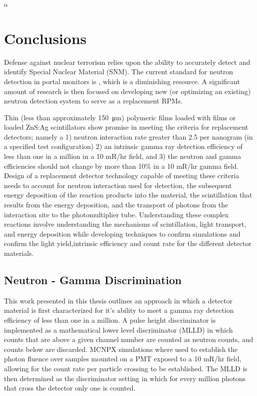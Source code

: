 o\chapter{Conclusions}
\label{chap:Conclusions}
Defense against nuclear terrorism relies upon the ability to accurately detect and identify Special Nuclear Material (SNM).
The current standard for neutron detection in portal monitors is , which is a diminishing resource. 
A significant amount of research is then focused on developing new (or optimizing an existing) neutron detection system to serve as a replacement RPMs.

Thin (less than approximately \SI{150}{\um}) polymeric films loaded with  films or  loaded ZnS:Ag scintillators show promise in meeting the criteria for replacement detectors; namely a 1) neutron interaction rate greater than 2.5 per nanogram  (in a specified test configuration) 2) an intrinsic gamma ray detection efficiency of less than one in a million in a 10 mR/hr field, and 3) the neutron and gamma efficiencies should not change by more than 10\% in a 10 mR/hr gamma field.
Design of a replacement detector technology capable of meeting these criteria needs to account for neutron interaction used for detection, the subsequent energy deposition  of the reaction products into the material, the scintillation that results from the energy deposition, and the transport of photons from the interaction site to the photomultiplier tube.
Understanding these complex reactions involve understanding the mechanisms of scintillation, light transport, and energy deposition while developing techniques to confirm simulations and confirm the light yield,intrinsic efficiency and count rate for the different detector materials.

\section{Neutron - Gamma Discrimination}
This work presented in this thesis outlines an approach in which a detector material is first characterized for it's ability to meet a gamma ray detection efficiency of less than one in a million. 
A pulse height discriminator is implemented as a mathematical lower level discriminator (MLLD) in which counts that are above a given channel number are counted as neutron counts, and counts below are discarded.
MCNPX simulations where used to establish the photon fluence over samples mounted on a PMT exposed to a 10 mR/hr field, allowing for the count rate per particle crossing to be established.
The MLLD is then determined as the discriminator setting in which for every million photons that cross the detector only one is counted.

